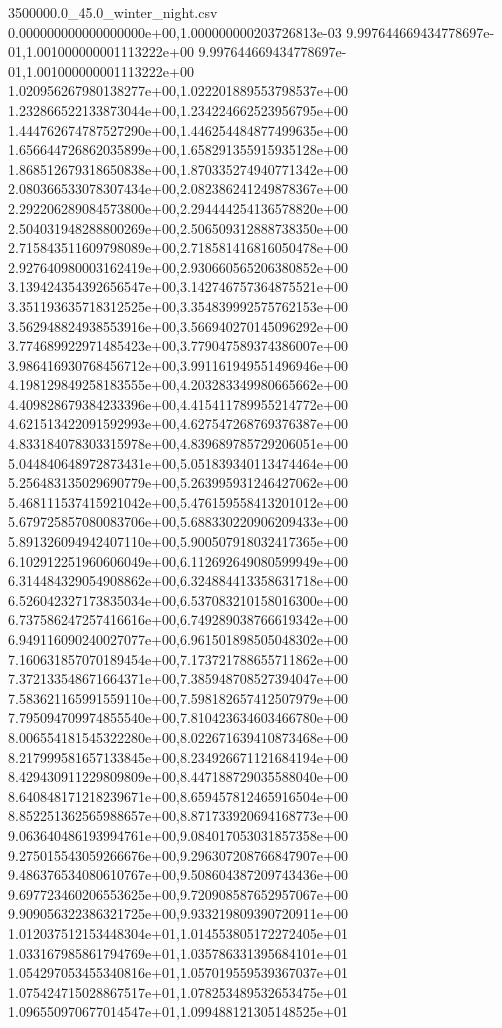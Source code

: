 \begin{filecontents*}{3500000.0_45.0_winter_night.csv}
0.000000000000000000e+00,1.000000000203726813e-03
9.997644669434778697e-01,1.001000000001113222e+00
9.997644669434778697e-01,1.001000000001113222e+00
1.020956267980138277e+00,1.022201889553798537e+00
1.232866522133873044e+00,1.234224662523956795e+00
1.444762674787527290e+00,1.446254484877499635e+00
1.656644726862035899e+00,1.658291355915935128e+00
1.868512679318650838e+00,1.870335274940771342e+00
2.080366533078307434e+00,2.082386241249878367e+00
2.292206289084573800e+00,2.294444254136578820e+00
2.504031948288800269e+00,2.506509312888738350e+00
2.715843511609798089e+00,2.718581416816050478e+00
2.927640980003162419e+00,2.930660565206380852e+00
3.139424354392656547e+00,3.142746757364875521e+00
3.351193635718312525e+00,3.354839992575762153e+00
3.562948824938553916e+00,3.566940270145096292e+00
3.774689922971485423e+00,3.779047589374386007e+00
3.986416930768456712e+00,3.991161949551496946e+00
4.198129849258183555e+00,4.203283349980665662e+00
4.409828679384233396e+00,4.415411789955214772e+00
4.621513422091592993e+00,4.627547268769376387e+00
4.833184078303315978e+00,4.839689785729206051e+00
5.044840648972873431e+00,5.051839340113474464e+00
5.256483135029690779e+00,5.263995931246427062e+00
5.468111537415921042e+00,5.476159558413201012e+00
5.679725857080083706e+00,5.688330220906209433e+00
5.891326094942407110e+00,5.900507918032417365e+00
6.102912251960606049e+00,6.112692649080599949e+00
6.314484329054908862e+00,6.324884413358631718e+00
6.526042327173835034e+00,6.537083210158016300e+00
6.737586247257416616e+00,6.749289038766619342e+00
6.949116090240027077e+00,6.961501898505048302e+00
7.160631857070189454e+00,7.173721788655711862e+00
7.372133548671664371e+00,7.385948708527394047e+00
7.583621165991559110e+00,7.598182657412507979e+00
7.795094709974855540e+00,7.810423634603466780e+00
8.006554181545322280e+00,8.022671639410873468e+00
8.217999581657133845e+00,8.234926671121684194e+00
8.429430911229809809e+00,8.447188729035588040e+00
8.640848171218239671e+00,8.659457812465916504e+00
8.852251362565988657e+00,8.871733920694168773e+00
9.063640486193994761e+00,9.084017053031857358e+00
9.275015543059266676e+00,9.296307208766847907e+00
9.486376534080610767e+00,9.508604387209743436e+00
9.697723460206553625e+00,9.720908587652957067e+00
9.909056322386321725e+00,9.933219809390720911e+00
1.012037512153448304e+01,1.014553805172272405e+01
1.033167985861794769e+01,1.035786331395684101e+01
1.054297053455340816e+01,1.057019559539367037e+01
1.075424715028867517e+01,1.078253489532653475e+01
1.096550970677014547e+01,1.099488121305148525e+01

\end{filecontents*}
